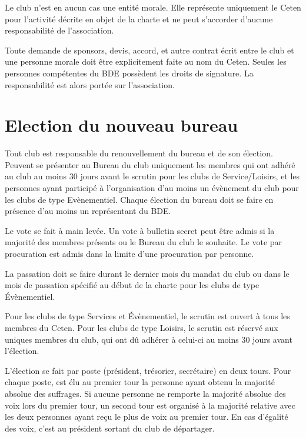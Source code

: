 \documentclass{article} %
\begin{document}
\begin{multicols}{2}
		{\small

			Le club n’est en aucun cas une entité morale. Elle
			représente uniquement le Ceten pour l’activité décrite en
			objet de la charte et ne peut s’accorder d’aucune
			responsabilité de l’association.

			Toute demande de sponsors, devis, accord, et autre contrat
			écrit entre le club et une personne morale doit être
			explicitement faite au nom du Ceten. Seules les personnes
			compétentes du BDE possèdent les droits de signature. La
			responsabilité est alors portée sur l’association.

		}

		\section{Election du nouveau bureau}

		{\small

			Tout club est responsable du renouvellement du bureau et
			de son élection. Peuvent se présenter au Bureau du club
			uniquement les membres qui ont adhéré au club au moins
			30 jours avant le scrutin pour les clubs de Service/Loisirs, et
			les personnes ayant participé à l’organisation d’au moins un
			évènement du club pour les clubs de type Evènementiel.
			Chaque élection du bureau doit se faire en présence d’au
			moins un représentant du BDE\@.

			Le vote se fait à main levée. Un vote à bulletin secret peut
			être admis si la majorité des membres présents ou le Bureau
			du club le souhaite. Le vote par procuration est admis dans
			la limite d’une procuration par personne.

			La passation doit se faire durant le dernier mois du mandat
			du club ou dans le mois de passation spécifié au début de la
			charte pour les clubs de type Évènementiel.

			Pour les clubs de type Services et Évènementiel, le scrutin
			est ouvert à tous les membres du Ceten. Pour les clubs de
			type Loisirs, le scrutin est réservé aux uniques membres du
			club, qui ont dû adhérer à celui-ci au moins 30 jours avant
			l’élection.

			L’élection se fait par poste (président, trésorier, secrétaire)
			en deux tours. Pour chaque poste, est élu au premier tour la
			personne ayant obtenu la majorité absolue des suffrages. Si
			aucune personne ne remporte la majorité absolue des voix
			lors du premier tour, un second tour est organisé à la
			majorité relative avec les deux personnes ayant reçu le plus
			de voix au premier tour. En cas d’égalité des voix, c’est au
			président sortant du club de départager.

}
\end{multicols}
\end{document}
